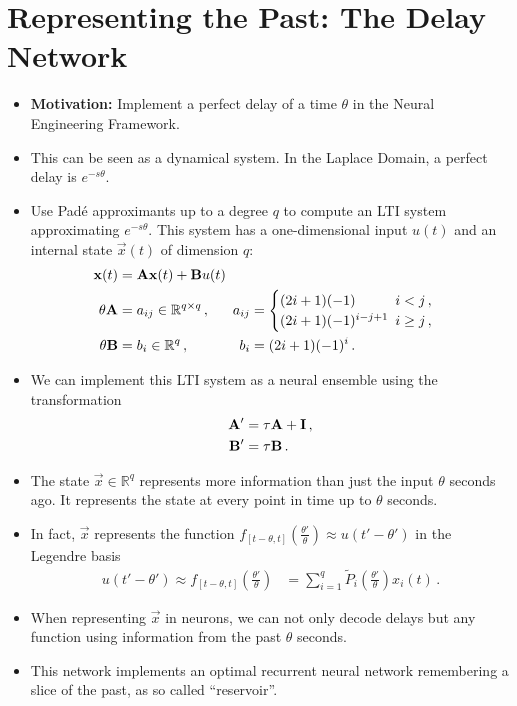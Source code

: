 \documentclass[10pt,letterpaper,oneside]{article}
\begin{document}
\section{Representing the Past: The Delay Network}

\begin{itemize}
	\item \textbf{Motivation:} Implement a perfect delay of a time $\theta$ in the Neural Engineering Framework.
	\item This can be seen as a dynamical system. In the Laplace Domain, a perfect delay is $e^{-s\theta}$.
	\item Use Padé approximants up to a degree $q$ to compute an LTI system approximating $e^{-s\theta}$. This system has a one-dimensional input $u(t)$ and an internal state $\vec x(t)$ of dimension $q$:
	\begin{align*}
		{\mathbf{x}}(t) &= {\mathbf{A}} {\mathbf{x}}(t) + {\mathbf{B}} u(t) \\
	    \theta {\mathbf{A}} &= a_{ij} \in \mathbb{R}^{q \times q} \,, & \kern-0.5em a_{ij} &= \begin{cases}
		(2i + 1)(-1) & \kern-0.5em i < j \,,\\
		(2i + 1)(-1)^{i - j + 1} & \kern-0.5em i \geq j \,,
		\end{cases}\\
		\theta {\mathbf{B}} &= b_i \in \mathbb{R}^{q} \,, & \kern-0.5em b_i &= (2i + 1)(-1)^i \,.
	\end{align*}
	\item We can implement this LTI system as a neural ensemble using the transformation
	\begin{align*}
		{\mathbf{A}}' &= \tau {\mathbf{A}} + {\mathbf{I}} \,,\\
		{\mathbf{B}}' &= \tau {\mathbf{B}} \,.
	\end{align*}
	\item The state $\vec x \in \mathbb{R}^q$ represents more information than just the input $\theta$ seconds ago. It represents the state at every point in time up to $\theta$ seconds.
	\item In fact, $\vec x$ represents the function $f_{[t - \theta, t]}\left(\frac{\theta'}{\theta}\right) \approx u\left(t' - \theta' \right)$ in the Legendre basis
	\begin{align*}
		u\left(t' - \theta' \right) \approx f_{[t - \theta, t]}\left(\frac{\theta'}{\theta}\right) &= \sum_{i=1}^q \tilde P_i \left( \frac{\theta'}{\theta} \right) x_i(t) \,.
	\end{align*}
	\item When representing $\vec x$ in neurons, we can not only decode delays but any function using information from the past $\theta$ seconds.
	\item This network implements an optimal recurrent neural network remembering a slice of the past, as so called \enquote{reservoir}.
\end{itemize}

\printbibliography
\end{document}
